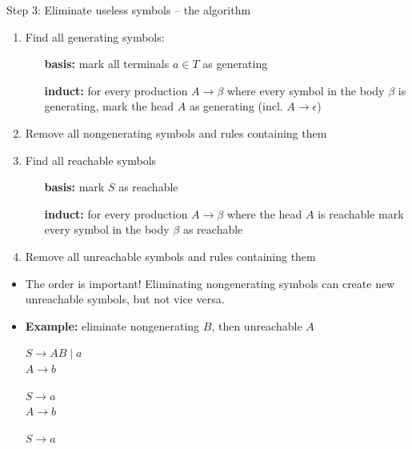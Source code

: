 \documentclass[handout]{beamer}
\begin{document}
\begin{frame}{Step 3: Eliminate useless symbols -- the algorithm}

	\begin{enumerate}
		\item Find all generating symbols:
		\begin{itemize}
			\item[\textbf{basis:}] mark all terminals $a\in T$ as generating
			\item[\textbf{induct:}] for every production $A\to\beta$ where every symbol in the body $\beta$ is generating, mark the head $A$ as generating (incl. $A\to \epsilon$)
		\end{itemize}
		\item Remove all \alert{nongenerating} symbols and rules containing them
		\item Find all reachable symbols
		\begin{itemize}
			\item[\textbf{basis:}] mark $S$ as reachable
			\item[\textbf{induct:}] for every production $A\to\beta$ where the head $A$ is reachable mark every symbol in the body $\beta$ as reachable
		\end{itemize}
		\item Remove all \alert{unreachable} symbols and rules containing them		
	\end{enumerate}

	\begin{itemize}
		\item The order is important! Eliminating nongenerating symbols can create new unreachable symbols, but not vice versa.
		\item \textbf{Example:} eliminate nongenerating $B$, then unreachable $A$
		\smallskip
		\begin{center}
			\begin{minipage}{0.25\textwidth}
				$S\to AB\mid a$\\
				$A\to b$
			\end{minipage}
			\begin{minipage}{0.25\textwidth}
				$S\to a$\\
				$A\to b$
			\end{minipage}
			\begin{minipage}{0.25\textwidth}
				$S\to a$
			\end{minipage}
		\end{center}
	\end{itemize}

\end{frame}
\end{document}

